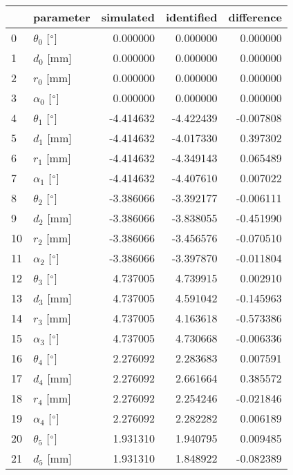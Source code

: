 \documentclass{standalone}%
\begin{document}
%
\normalsize%
\begin{tabular}{llrrr}
\toprule
{} &                 parameter & simulated & identified & difference \\
\midrule
0  &  $\theta_{0}$ [$\degree$] &  0.000000 &   0.000000 &   0.000000 \\
1  &              $d_{0}$ [mm] &  0.000000 &   0.000000 &   0.000000 \\
2  &              $r_{0}$ [mm] &  0.000000 &   0.000000 &   0.000000 \\
3  &  $\alpha_{0}$ [$\degree$] &  0.000000 &   0.000000 &   0.000000 \\
4  &  $\theta_{1}$ [$\degree$] & -4.414632 &  -4.422439 &  -0.007808 \\
5  &              $d_{1}$ [mm] & -4.414632 &  -4.017330 &   0.397302 \\
6  &              $r_{1}$ [mm] & -4.414632 &  -4.349143 &   0.065489 \\
7  &  $\alpha_{1}$ [$\degree$] & -4.414632 &  -4.407610 &   0.007022 \\
8  &  $\theta_{2}$ [$\degree$] & -3.386066 &  -3.392177 &  -0.006111 \\
9  &              $d_{2}$ [mm] & -3.386066 &  -3.838055 &  -0.451990 \\
10 &              $r_{2}$ [mm] & -3.386066 &  -3.456576 &  -0.070510 \\
11 &  $\alpha_{2}$ [$\degree$] & -3.386066 &  -3.397870 &  -0.011804 \\
12 &  $\theta_{3}$ [$\degree$] &  4.737005 &   4.739915 &   0.002910 \\
13 &              $d_{3}$ [mm] &  4.737005 &   4.591042 &  -0.145963 \\
14 &              $r_{3}$ [mm] &  4.737005 &   4.163618 &  -0.573386 \\
15 &  $\alpha_{3}$ [$\degree$] &  4.737005 &   4.730668 &  -0.006336 \\
16 &  $\theta_{4}$ [$\degree$] &  2.276092 &   2.283683 &   0.007591 \\
17 &              $d_{4}$ [mm] &  2.276092 &   2.661664 &   0.385572 \\
18 &              $r_{4}$ [mm] &  2.276092 &   2.254246 &  -0.021846 \\
19 &  $\alpha_{4}$ [$\degree$] &  2.276092 &   2.282282 &   0.006189 \\
20 &  $\theta_{5}$ [$\degree$] &  1.931310 &   1.940795 &   0.009485 \\
21 &              $d_{5}$ [mm] &  1.931310 &   1.848922 &  -0.082389 \\

\end{tabular}
\end{document}
